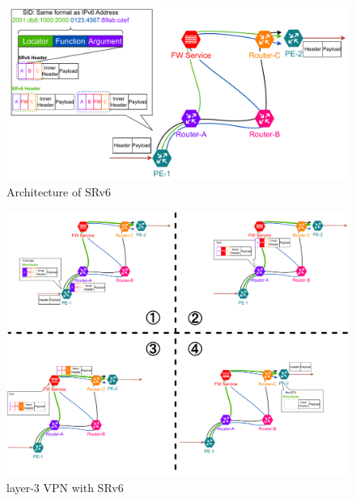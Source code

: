 
\begin{figure}[t]
    \centering
    \includegraphics[width=0.95\linewidth]{img/SRv6Arch.pdf}
    \caption{Architecture of SRv6}
    \label{fig:srv6}
\end{figure}

\begin{figure}[t]
    \centering
    \includegraphics[width=0.95\linewidth]{img/ExplainEndDT4.pdf}
    \caption{layer-3 VPN with SRv6}
    \label{fig:srv6-vpn}
\end{figure}

